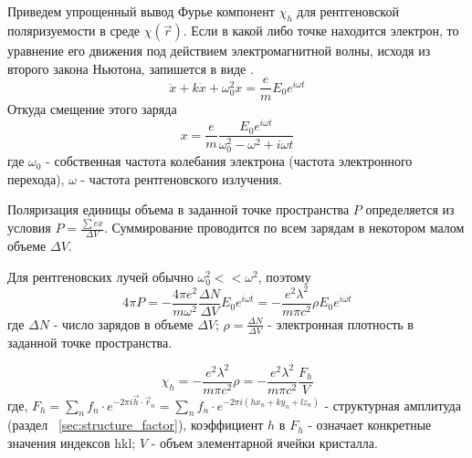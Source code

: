 \begin{center}
  \section{ }%
  \label{sec:polarizability}
\end{center}

Приведем упрощенный вывод Фурье компонент  $\chi_h$  для рентгеновской
поляризуемости в среде  $\chi(\vec{r})$. Если в какой либо точке находится электрон,
то уравнение его движения под действием электромагнитной волны,
исходя из второго закона Ньютона, запишется в виде \cite{iveronova1972}.
\begin{equation}
  \ddot{x}+ k\dot{x} + \omega_0^2 x = \frac{e}{m}E_0e^{i\omega t}
 \end{equation}
Откуда смещение этого заряда
\begin{equation}
  x = \frac{e}{m} \frac{E_0e^{i\omega t}}{\omega_0^2 - \omega^2+i\omega t}
 \end{equation}
где $\omega_0 $ - собственная частота колебания электрона (частота электронного перехода), $\omega$ - частота рентгеновского излучения.

Поляризация единицы объема в заданной точке пространства $P$ определяется из условия
$P = \frac{\sum e x}{\Delta V}$. Суммирование проводится по всем зарядам в
некотором малом объеме  $\Delta V$.

Для рентгеновских лучей обычно $\omega_0^2 << \omega^2$, поэтому
\begin{equation}
  4\pi P = - \frac{4\pi e^2}{m\omega^2}\frac{\Delta N}{\Delta V} E_0 e^{i\omega t} = -\frac{e^2 \lambda^2}{m \pi c^2} \rho E_0 e^{i\omega t}
 \end{equation}
где $\Delta N$ - число зарядов в объеме $\Delta V$;
$\rho = \frac{\Delta N}{\Delta V}$ - электронная плотность в заданной точке пространства.


\begin{equation}
  \chi_h = -\frac{e^2 \lambda^2}{m \pi c^2}  \rho = -\frac{e^2 \lambda^2}{m \pi c^2} \frac{F_h}{V}
 \end{equation}
 где, $ F_h = \sum_{n} f_n \cdot e^{-2\pi i\vec{h}\cdot \vec{r}_n}= \sum_{n} f_n \cdot e^{- 2 \pi i (hx_n+ky_n+lz_n)}$ -
 структурная амплитуда (раздел ~\ref{sec:structure_factor}),
 коэффициент $h$ в $F_h$ - означает конкретные значения индексов {hkl}; $V$ - объем элементарной ячейки кристалла.
